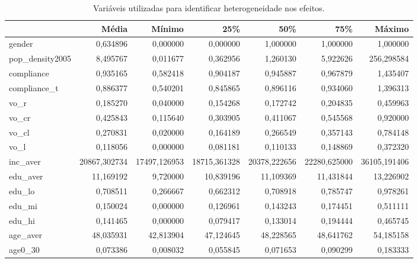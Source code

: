 \begin{table}
\centering
\caption{Variáveis utilizadas para identificar heterogeneidade nos efeitos.}
\label{tab:het-vars}
\begin{tabular}{lrrrrrr}
\toprule
{} &          Média &           Mínimo &           25\% &           50\% &           75\% &           Máximo \\
\midrule
gender          &      0,634896 &      0,000000 &      0,000000 &      1,000000 &      1,000000 &      1,000000 \\
pop\_density2005 &      8,495767 &      0,011677 &      0,362956 &      1,260130 &      5,922626 &    256,298584 \\
compliance      &      0,935165 &      0,582418 &      0,904187 &      0,945887 &      0,967879 &      1,435407 \\
compliance\_t    &      0,886377 &      0,540201 &      0,845865 &      0,896116 &      0,934060 &      1,396313 \\
vo\_r            &      0,185270 &      0,040000 &      0,154268 &      0,172742 &      0,204835 &      0,459963 \\
vo\_cr           &      0,425843 &      0,115640 &      0,303905 &      0,411067 &      0,545568 &      0,920000 \\
vo\_cl           &      0,270831 &      0,020000 &      0,164189 &      0,266549 &      0,357143 &      0,784148 \\
vo\_l            &      0,118056 &      0,000000 &      0,081181 &      0,110133 &      0,148869 &      0,372320 \\
inc\_aver        &  20867,302734 &  17497,126953 &  18715,361328 &  20378,222656 &  22280,625000 &  36105,191406 \\
edu\_aver        &     11,169192 &      9,720000 &     10,839196 &     11,109369 &     11,431844 &     13,226902 \\
edu\_lo          &      0,708511 &      0,266667 &      0,662312 &      0,708918 &      0,785747 &      0,978261 \\
edu\_mi          &      0,150024 &      0,000000 &      0,126961 &      0,143243 &      0,174451 &      0,511111 \\
edu\_hi          &      0,141465 &      0,000000 &      0,079417 &      0,133014 &      0,194444 &      0,465745 \\
age\_aver        &     48,035931 &     42,813904 &     47,124645 &     48,228565 &     48,641762 &     54,185158 \\
age0\_30         &      0,073386 &      0,008032 &      0,055845 &      0,071653 &      0,090299 &      0,183333 \\

\end{tabular}
\end{table}
